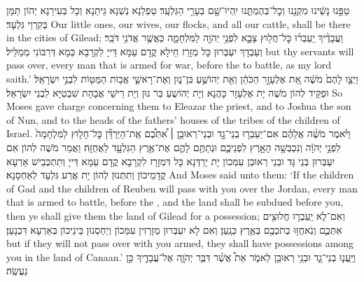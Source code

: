 {טַפֵּ֣נוּ נָשֵׁ֔ינוּ מִקְנֵ֖נוּ וְכׇל־בְּהֶמְתֵּ֑נוּ יִֽהְיוּ־שָׁ֖ם בְּעָרֵ֥י הַגִּלְעָֽד׃}
{טַפְלַנָא נְשַׁנָא גֵּיתַנָא וְכָל בְּעִירַנָא יְהוֹן תַּמָּן בְּקִרְוֵי גִּלְעָד׃}
{Our little ones, our wives, our flocks, and all our cattle, shall be there in the cities of Gilead;}{}
{וַעֲבָדֶ֨יךָ יַֽעַבְר֜וּ כׇּל־חֲל֥וּץ צָבָ֛א לִפְנֵ֥י יְהֹוָ֖ה לַמִּלְחָמָ֑ה כַּאֲשֶׁ֥ר אֲדֹנִ֖י דֹּבֵֽר׃}
{וְעַבְדָךְ יִעְבְּרוּן כָּל מְזָרַז חֵילָא קֳדָם עַמָּא דַּייָ לִקְרָבָא כְּמָא דְּרִבּוֹנִי מְמַלֵּיל׃}
{but thy servants will pass over, every man that is armed for war, before the \lord\space to battle, as my lord saith.’}{}
{וַיְצַ֤ו לָהֶם֙ מֹשֶׁ֔ה אֵ֚ת אֶלְעָזָ֣ר הַכֹּהֵ֔ן וְאֵ֖ת יְהוֹשֻׁ֣עַ בִּן־נ֑וּן וְאֶת־רָאשֵׁ֛י אֲב֥וֹת הַמַּטּ֖וֹת לִבְנֵ֥י יִשְׂרָאֵֽל׃
}
{וּפַקֵּיד לְהוֹן מֹשֶׁה יָת אֶלְעָזָר כָּהֲנָא וְיָת יְהוֹשֻעַ בַּר נוּן וְיָת רֵישֵׁי אֲבָהָת שִׁבְטַיָּא לִבְנֵי יִשְׂרָאֵל׃}
{So Moses gave charge concerning them to Eleazar the priest, and to Joshua the son of Nun, and to the heads of the fathers’ houses of the tribes of the children of Israel.}{}
{וַיֹּ֨אמֶר מֹשֶׁ֜ה אֲלֵהֶ֗ם אִם־יַעַבְר֣וּ בְנֵי־גָ֣ד וּבְנֵי־רְאוּבֵ֣ן \small ׀\normalsize  אִ֠תְּכֶ֠ם אֶֽת־הַיַּרְדֵּ֞ן כׇּל־חָל֤וּץ לַמִּלְחָמָה֙ לִפְנֵ֣י יְהֹוָ֔ה וְנִכְבְּשָׁ֥ה הָאָ֖רֶץ לִפְנֵיכֶ֑ם וּנְתַתֶּ֥ם לָהֶ֛ם אֶת־אֶ֥רֶץ הַגִּלְעָ֖ד לַאֲחֻזָּֽה׃}
{וַאֲמַר מֹשֶׁה לְהוֹן אִם יִעְבְּרוּן בְּנֵי גָּד וּבְנֵי רְאוּבֵן עִמְּכוֹן יָת יַרְדְּנָא כָּל דִּמְזָרַז לִקְרָבָא קֳדָם עַמָּא דַּייָ וְתִתְכְּבֵישׁ אַרְעָא קֳדָמֵיכוֹן וְתִתְּנוּן לְהוֹן יָת אֲרַע גִּלְעָד לְאַחְסָנָא׃}
{And Moses said unto them: ‘If the children of Gad and the children of Reuben will pass with you over the Jordan, every man that is armed to battle, before the \lord, and the land shall be subdued before you, then ye shall give them the land of Gilead for a possession;}{}
{וְאִם־לֹ֧א יַֽעַבְר֛וּ חֲלוּצִ֖ים אִתְּכֶ֑ם וְנֹֽאחֲז֥וּ בְתֹכְכֶ֖ם בְּאֶ֥רֶץ כְּנָֽעַן׃}
{וְאִם לָא יִעְבְּרוּן מְזָרְזִין עִמְּכוֹן וְיַחְסְנוּן בֵּינֵיכוֹן בְּאַרְעָא דִּכְנָעַן׃}
{but if they will not pass over with you armed, they shall have possessions among you in the land of Canaan.’}{}
{וַיַּֽעֲנ֧וּ בְנֵי־גָ֛ד וּבְנֵ֥י רְאוּבֵ֖ן לֵאמֹ֑ר אֵת֩ אֲשֶׁ֨ר דִּבֶּ֧ר יְהֹוָ֛ה אֶל־עֲבָדֶ֖יךָ כֵּ֥ן נַעֲשֶֽׂה׃}
